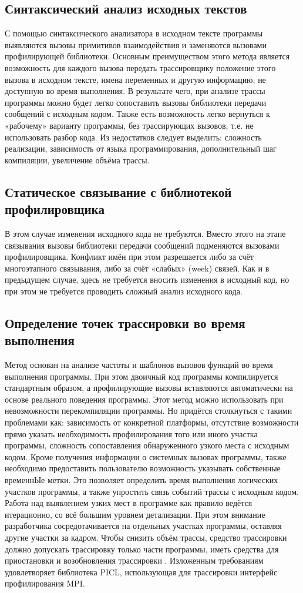 \subsection{Синтаксический анализ исходных текстов} С помощью синтаксического анализатора в исходном тексте программы выявляются вызовы примитивов взаимодействия и заменяются вызовами профилирующей библиотеки. Основным преимуществом этого метода является возможность для каждого вызова передать трассировщику положение этого вызова в исходном тексте, имена переменных и другую информацию, не доступную во время выполнения. В результате чего, при анализе трассы программы можно будет легко сопоставить вызовы библиотеки передачи сообщений с исходным кодом. Также есть возможность легко вернуться к «рабочему» варианту программы, без трассирующих вызовов, т.е. не использовать разбор кода. Из недостатков следует выделить: сложность реализации, зависимость от языка программирования, дополнительный шаг компиляции, увеличение объёма трассы.
\subsection{Статическое связывание с библиотекой профилировщика} В этом случае изменения исходного кода не требуются. Вместо этого на этапе связывания вызовы библиотеки передачи сообщений подменяются вызовами профилировщика. Конфликт имён при этом разрешается либо за счёт многоэтапного связывания, либо за счёт «слабых» (week) связей. Как и в предыдущем случае, здесь не требуется вносить изменения в исходный код, но при этом не требуется проводить сложный анализ исходного кода.
\subsection{Определение точек трассировки во время выполнения} Метод основан на анализе частоты и шаблонов вызовов функций во время выполнения программы. При этом двоичный код программы компилируется стандартным образом, а профилирующие вызовы вставляются автоматически на основе реального поведения программы. Этот метод можно использовать при невозможности перекомпиляции программы. Но придётся столкнуться с такими проблемами как: зависимость от конкретной платформы, отсутствие возможности прямо указать необходимость профилирования того или иного участка программы, сложность сопоставления обнаруженного узкого места с исходным кодом.
Кроме получения информации о системных вызовах программы, также необходимо предоставить пользователю возможность указывать собственные временнЫе метки. Это позволяет определить время выполнения логических участков программы, а также упростить связь событий трассы с исходным кодом.
Работа над выявлением узких мест в программе как правило ведётся итерационно, со всё большим уровнем детализации. При этом внимание разработчика сосредотачивается на отдельных участках программы, оставляя другие участки за кадром. Чтобы снизить объём трассы, средство трассировки должно допускать трассировку только части программы, иметь средства для приостановки и возобновления трассировки \cite{book3}.
Изложенным требованиям удовлетворяет библиотека PICL, использующая для трассировки интерфейс профилирования MPI.
